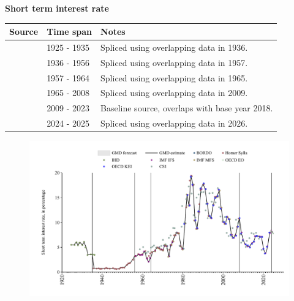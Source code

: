 \documentclass[12pt,a4paper,landscape]{article}
\begin{document}
\begin{adjustbox}{max totalsize={\paperwidth}{\paperheight},center}
\begin{minipage}[t][\textheight][t]{\textwidth}
\vspace*{0.5cm}
{}
\begin{center}
{\Large\bfseries Short term interest rate}
\end{center}
\vspace{0.5cm}
\begin{table}[H]
\centering
\small
\begin{tabular}{|l|l|l|}
\hline
\textbf{Source} & \textbf{Time span} & \textbf{Notes} \\
\hline
\rowcolor{white}\cite{IHD}& 1925 - 1935 &Spliced using overlapping data in 1936. \\
\rowcolor{lightgray}\cite{Homer_Sylla}& 1936 - 1956 &Spliced using overlapping data in 1957. \\
\rowcolor{white}\cite{IMF_IFS}& 1957 - 1964 &Spliced using overlapping data in 1965. \\
\rowcolor{lightgray}\cite{IMF_MFS}& 1965 - 2008 &Spliced using overlapping data in 2009. \\
\rowcolor{white}\cite{OECD_KEI}& 2009 - 2023 &Baseline source, overlaps with base year 2018. \\
\rowcolor{lightgray}\cite{OECD_EO}& 2024 - 2025 &Spliced using overlapping data in 2026. \\
\hline
\end{tabular}
\end{table}
\begin{figure}[H]
\centering
\includegraphics[width=\textwidth,height=0.6\textheight,keepaspectratio]{graphs/ZAF_strate.pdf}
\end{figure}
\end{minipage}
\end{adjustbox}
\end{document}
